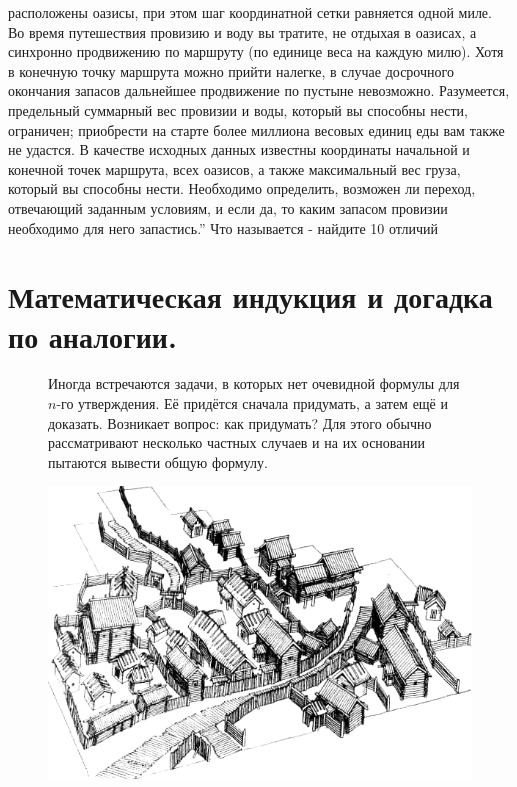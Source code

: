 {расположены оазисы, при этом шаг координатной сетки равняется одной миле. Во время путешествия провизию и воду вы тратите, не отдыхая в оазисах, а синхронно продвижению по маршруту (по единице веса на каждую милю). Хотя в конечную точку маршрута можно прийти налегке, в случае досрочного окончания запасов дальнейшее продвижение по пустыне невозможно. Разумеется, предельный суммарный вес провизии и воды, который вы способны нести, ограничен; приобрести на старте более миллиона весовых единиц еды вам также не удастся. В качестве исходных данных известны координаты начальной и конечной точек маршрута, всех оазисов, а также максимальный вес груза, который вы способны нести. Необходимо определить, возможен ли переход, отвечающий заданным условиям, и если да, то каким запасом провизии необходимо для него запастись.'' Что называется - найдите 10 отличий \smiley}

\newpage

\section{Математическая индукция и догадка по аналогии.}

{\setlength{\intextsep}{2pt}
\begin{figure}[h]
\begin{minipage}{0.64\linewidth}\setlength{\parindent}{1.5em}
Иногда встречаются задачи, в которых нет очевидной формулы
для $n$-го утверждения. Её придётся сначала придумать, а затем
ещё и доказать. Возникает вопрос: как придумать? Для этого
обычно рассматривают несколько частных случаев и на их
основании пытаются вывести общую формулу.
\end{minipage}
\hfill
\begin{minipage}{0.35\linewidth}
    \includegraphics[width=0.95\columnwidth]{img/city.png}
\end{minipage}
\end{figure}}

